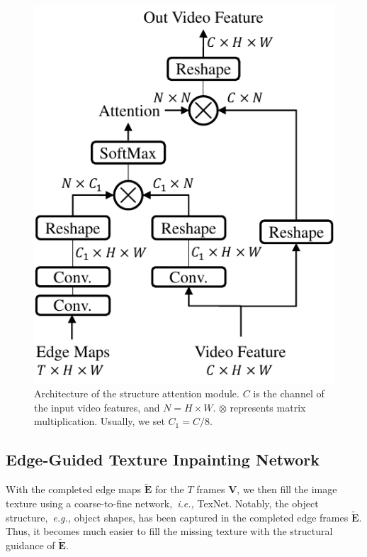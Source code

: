 \begin{figure}[t]
	\centering
	\includegraphics[width=0.65\columnwidth]{SEM} %
	\caption{Architecture of the structure attention module. $C$ is the channel of the input video features, and $N=H\times W$. $\otimes$ represents matrix multiplication. Usually, we set $C_1=C/8$.}
	\label{SEM}
\end{figure} 




\subsection{Edge-Guided Texture Inpainting Network}


With the completed edge maps $\boldsymbol{\widetilde{E}}$ for the $T$ frames $\boldsymbol{V}$, we then fill the image texture using a coarse-to-fine network,~\emph{i.e.,} TexNet.
%
Notably, the object structure,~\emph{e.g.,} object shapes, has been captured in the completed edge frames $\boldsymbol{\widetilde{E}}$.
Thus, it becomes much easier to fill the missing texture with the structural guidance of $\boldsymbol{\widetilde{E}}$.

